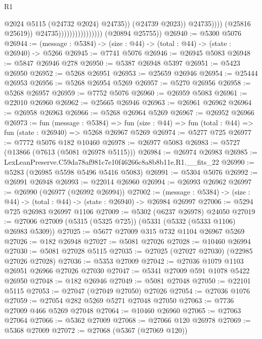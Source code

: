 \begin{lexlean}{R1}
\begin{coremodule}
                                                      @2024
                                                      @5115
                                                      (@24732 @2024)
                                                      @24735))
                                                  (@24739 @2023))
                                                @24735))))
                                        (@25816 @25619))
                                      @24735))))))))))))))))
      (@20894 @25755))
@26940 := @5300 @5076
@26944 := (message : @5384) -> (size : @44) -> (total : @44) -> (state : @26940) -> @5266
@26945 := @7741 @5076
@26946 := @26945 @5083
@26948 := @5847 @26946 @278
@26950 := @5387 @26948 @5397
@26951 := @5423 @26950
@26952 := @5268 @26951
@26953 := @25659 @26946
@26954 := @25444 @26953
@26956 := @5268 @26954 @5269
@26957 := @5270 @26956
@26958 := @5268 @26957
@26959 := @7752 @5076
@26960 := @26959 @5083
@26961 := @22010 @26960
@26962 := @25665 @26946
@26963 := @26961 @26962
@26964 := @26958 @26963
@26966 := @5268 @26964 @5269
@26967 := @26952 @26966
@26973 := fun (message : @5384) =>
  fun (size : @44) => fun (total : @44) => fun (state : @26940) => @5268 @26967 @5269
@26974 := @5277 @725
@26977 := @7772 @5076 @182 @10460
@26978 := @26977 @5083
@26983 := @5727 (@13866 (@7613 (@5081 @26978 @5115)))
@26984 := @26974 @26983
@26985 := LexLeanPreserve.C59da78af981c7e10f46266c8a8b8b11e.R1.__fits_22
@26990 := @5283 (@26985 @5598 @5496 @5416 @5083)
@26991 := @5304 @5076
@26992 := @26991 @26948
@26993 := @22014 @26960
@26994 := @26993 @26962
@26997 := @26990 (@26977 (@26992 @26994))
@27002 := (message : @5384) -> (size : @44) -> (total : @44) -> (state : @26940) -> @26984 @26997
@27006 := @5294 @725 @26983 @26997 @1106
@27009 := @5302 (@6237 @26978) @24050
@27019 := @27006 @27009 (@5315 (@5325 @725)) (@5331 (@5332 (@5333 @1106) @26983 @5309))
@27025 := @5677 @27009 @315 @732 @1104 @26967 @5269
@27026 := @182 @26948
@27027 := @5081 @27026
@27028 := @10460 @26994
@27030 := @5081 @27028 @5115
@27035 := @27025 (@27027 @27030) (@22985 @27026 @27028)
@27036 := @5353 @27009
@27042 := @27036 @1079 @1103 @26951 @26966 @27026 @27030
@27047 := @5341 @27009 @591 @1078 @5422 @26950
@27048 := @182 @26946
@27049 := @5081 @27048
@27050 := @22101 @5115
@27053 := @27047 (@27049 @27050) @27026
@27054 := @27036 @1076
@27059 := @27054 @282 @5269 @5271 @27048 @27050
@27063 := @7736 @27009 @466 @5269 @27048
@27064 := @10460 @26960
@27065 := @27063 @27064
@27066 := @5362 @27009
@27068 := @27066 @120 @26978
@27069 := @5368 @27009
@27072 := @27068 (@5367 (@27069 @120))

\end{coremodule}
\end{lexlean}
